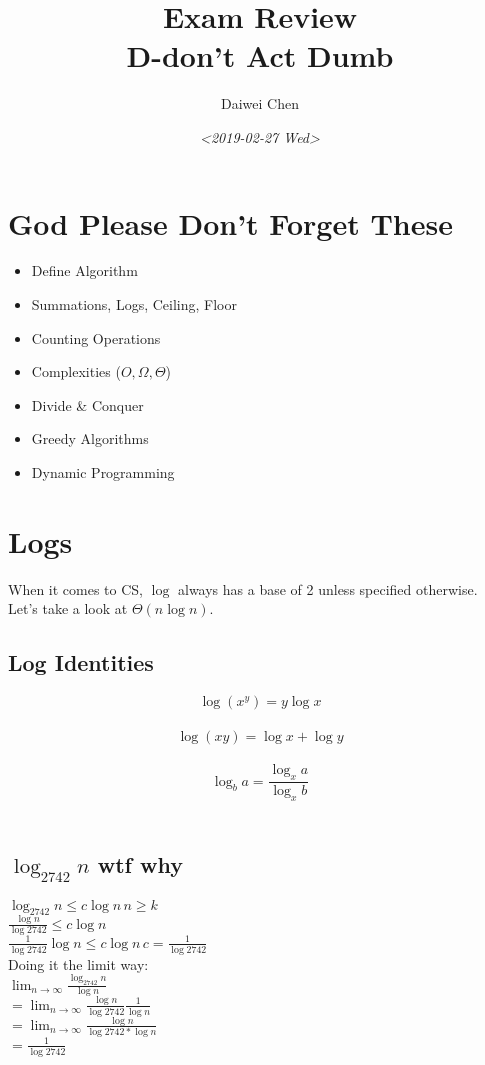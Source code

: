 \documentclass{article}
\author{Daiwei Chen}
\date{\textit{<2019-02-27 Wed>}}
\title{Exam Review\\\medskip
\large D-don't Act Dumb}
\begin{document}
\maketitle
\tableofcontents


\section{God Please Don't Forget These}
\label{sec:org5751d31}
\begin{itemize}
\item Define Algorithm
\item Summations, Logs, Ceiling, Floor
\item Counting Operations
\item Complexities (\(O, \Omega, \Theta\))
\item Divide \& Conquer
\item Greedy Algorithms
\item Dynamic Programming
\end{itemize}

\section{Logs}
\label{sec:org89b7e30}
When it comes to CS, \(\log\) always has a base of 2 unless specified otherwise.
Let's take a look at \(\Theta(n\log n)\).

\subsection{Log Identities}
\label{sec:org6e1880d}
$$\log (x^y) = y\log x$$ \\
$$\log (xy) = \log x + \log y$$ \\
$$\log_b a = \frac{\log_x a}{\log_x b}$$ \\

\subsection{\(\log_{2742} n\) wtf why}
\label{sec:orgd2d8991}
\(\log_{2742} n \leq c\log n \, n \geq k\) \\
\(\frac{\log n}{\log 2742} \leq c\log n\) \\
\(\frac{1}{\log 2742}\log n \leq c\log n \, c=\frac{1}{\log 2742}\) \\

Doing it the limit way: \\
\(\lim_{n\to\infty}\frac{\log_{2742} n}{\log n}\) \\
\(= \lim_{n\to\infty}\frac{\log n}{\log 2742}\frac{1}{\log n}\) \\
\(= \lim_{n\to\infty}\frac{\log n}{\log 2742*\log n}\) \\
\(= \frac{1}{\log2742}\) \\
\end{document}
